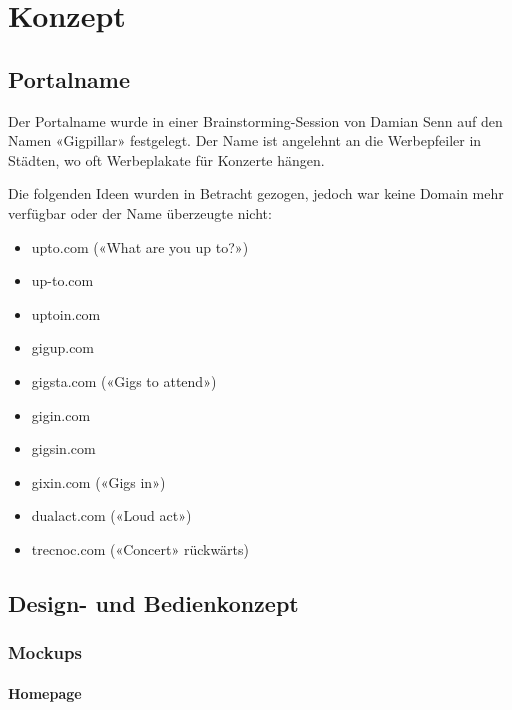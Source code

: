 \chapter{Konzept}

\label{AppendixKonzept}

\section{Portalname}\label{portalname}

Der Portalname wurde in einer Brainstorming-Session von Damian Senn auf
den Namen «Gigpillar» festgelegt. Der Name ist angelehnt an die Werbepfeiler in
Städten, wo oft Werbeplakate für Konzerte hängen.

Die folgenden Ideen wurden in Betracht gezogen, jedoch war keine Domain mehr
verfügbar oder der Name überzeugte nicht:

\begin{itemize}
  \item{} upto.com («What are you up to?»)
  \item{} up-to.com
  \item{} uptoin.com
  \item{} gigup.com
  \item{} gigsta.com («Gigs to attend»)
  \item{} gigin.com
  \item{} gigsin.com
  \item{} gixin.com («Gigs in»)
  \item{} dualact.com («Loud act»)
  \item{} trecnoc.com («Concert» rückwärts)
\end{itemize}

\clearpage
\section{Design- und Bedienkonzept}\label{design--und-bedienkonzept}

\subsection{Mockups}

\subsubsection{Homepage}


